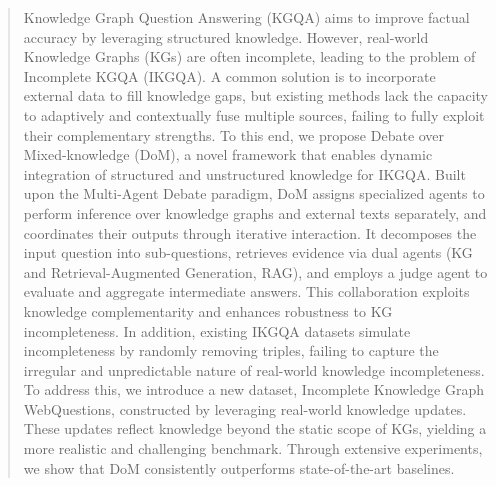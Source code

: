 \begin{abstract}
Knowledge Graph Question Answering (KGQA) aims to improve factual accuracy by leveraging structured knowledge. However, real-world Knowledge Graphs (KGs) are often incomplete, leading to the problem of Incomplete KGQA (IKGQA). A common solution is to incorporate external data to fill knowledge gaps, but existing methods lack the capacity to adaptively and contextually fuse multiple sources, failing to fully exploit their complementary strengths.
To this end, we propose Debate over Mixed-knowledge (DoM), a novel framework that enables dynamic integration of structured and unstructured knowledge for IKGQA. Built upon the Multi-Agent Debate paradigm, DoM assigns specialized agents to perform inference over knowledge graphs and external texts separately, and coordinates their outputs through iterative interaction. It decomposes the input question into sub-questions, retrieves evidence via dual agents (KG and Retrieval-Augmented Generation, RAG), and employs a judge agent to evaluate and aggregate intermediate answers. This collaboration exploits knowledge complementarity and enhances robustness to KG incompleteness.
In addition, existing IKGQA datasets simulate incompleteness by randomly removing triples, failing to capture the irregular and unpredictable nature of real-world knowledge incompleteness. To address this, we introduce a new dataset, Incomplete Knowledge Graph WebQuestions, constructed by leveraging real-world knowledge updates. These updates reflect knowledge beyond the static scope of KGs, yielding a more realistic and challenging benchmark. Through extensive experiments, we show that DoM consistently outperforms state-of-the-art baselines.
\end{abstract}


